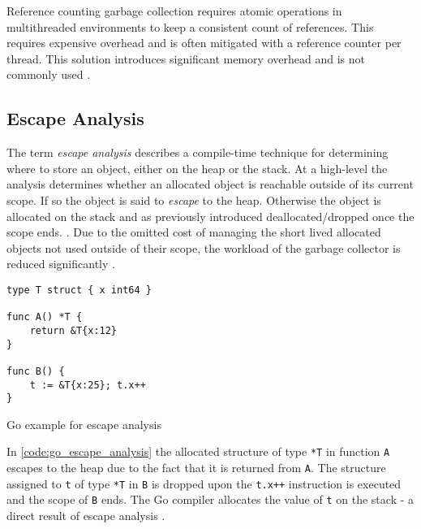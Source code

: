Reference counting garbage collection requires atomic operations in
multithreaded environments to keep a consistent count of references. This
requires expensive overhead and is often mitigated with a reference counter per
thread. This solution introduces significant memory overhead and is not
commonly used \cite[1.2 Reference-Counting on a
Multiprocessor]{gc-on-the-fly_2006}.

\subsection{Escape Analysis}

The term \textit{escape analysis} describes a compile-time technique for
determining where to store an object, either on the heap or the stack. At a
high-level the analysis determines whether an allocated object is reachable
outside of its current scope. If so the object is said to \textit{escape} to
the heap. Otherwise the object is allocated on the stack and as previously
introduced deallocated/dropped once the scope ends.
\cite[\texttt{l.18}]{go-escape}. Due to the omitted cost of managing the short
lived allocated objects not used outside of their scope, the workload of the
garbage collector is reduced significantly \cite[Escape
analysis]{go_gcguide_2022}.


\begin{listing}[H] 
    \begin{verbatim} 
type T struct { x int64 }

func A() *T {
    return &T{x:12}
}

func B() {
    t := &T{x:25}; t.x++
}
    \end{verbatim}
    \caption{Go example for escape analysis}
    \label{code:go_escape_analysis}
\end{listing}

In \autoref{code:go_escape_analysis} the allocated structure of type
\texttt{*T} in function \texttt{A} escapes to the heap due to the fact that it
is returned from \texttt{A}. The structure assigned to \texttt{t} of type
\texttt{*T} in \texttt{B} is dropped upon the \texttt{t.x++}
instruction is executed and the scope of \texttt{B} ends. The Go compiler
allocates the value of \texttt{t} on the stack - a direct result of escape
analysis \cite{go-escape}.
